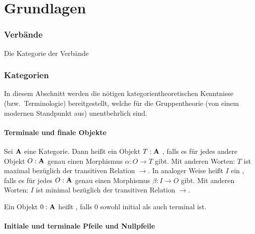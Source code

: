 \part{Grundlagen}

\section{Verbände}

\begin{definition}
    Die Kategorie der Verbände
\end{definition}

\section{Kategorien}

In diesem Abschnitt werden die nötigen kategorientheoretischen Kenntnisse (bzw.~Terminologie) bereitgestellt, welche für die
Gruppentheorie (von einem modernen Standpunkt aus) unentbehrlich sind.

\subsection{Terminale und finale Objekte}

\begin{definition}
    Sei $\mathbf{A}$ eine Kategorie. Dann heißt ein Objekt $T:\mathbf{A}$ , falls es für jedes andere Objekt $O:\mathbf{A}$ genau
    einen Morphismus $\alpha:O\to T$ gibt. Mit anderen Worten: $T$ ist maximal bezüglich der transitiven Relation $\to$.
    In analoger Weise heißt $I$ ein , falls es für jedes $O:\mathbf{A}$
    genau einen Morphismus $\beta:I\to O$ gibt. Mit anderen Worten: $I$ ist minimal bezüglich der transitiven Relation $\to$. 
\end{definition}

\begin{definition}[Nullobjekt]
    Ein Objekt $0:\mathbf{A}$ heißt , falls $0$ sowohl initial als auch terminal ist.
\end{definition}

\subsection{Initiale und terminale Pfeile und Nullpfeile}

